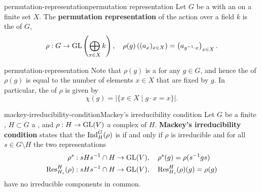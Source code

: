 \begin{topic}{permutation-representation}{permutation representation}
    Let $G$ be a  with an  on a finite set $X$. The \textbf{permutation representation} of the action over a field $k$ is the  of $G$,
    \[ \rho : G \to \textup{GL}\left( \bigoplus_{x \in X} k \right), \quad \rho(g)\left( (a_x)_{x \in X} \right) = \left( a_{g^{-1} \cdot x} \right)_{x \in X} . \]
\end{topic}

\begin{example}{permutation-representation}
    Note that $\rho(g)$ is a  for any $g \in G$, and hence the  of $\rho(g)$ is equal to the number of elements $x \in X$ that are fixed by $g$. In particular, the  of $\rho$ is given by
    \[ \chi(g) = |\{ x \in X \mid g \cdot x = x \}| . \]
\end{example}

\begin{topic}{mackey-irreducibility-condition}{Mackey's irreducibility condition}
    Let $G$ be a finite , $H \subset G$ a , and $\rho : H \to \textup{GL}(V)$ a complex  of $H$. \textbf{Mackey's irreducibility condition} states that the  $\textup{Ind}_H^G(\rho)$ is  if and only if $\rho$ is irreducible and for all $s \in G \setminus H$ the two representations
    \[ \begin{aligned}
        \rho^s &: s H s^{-1} \cap H \to \textup{GL}(V), \quad \rho^s(g) = \rho(s^{-1} g s) \\
        \textup{Res}_{H_s}^{H}(\rho) &: s H s^{-1} \cap H \to \textup{GL}(V) , \quad \textup{Res}_{H_s}^{H}(\rho)(g) = \rho(g)
    \end{aligned} \]
    have no irreducible components in common.
\end{topic}


